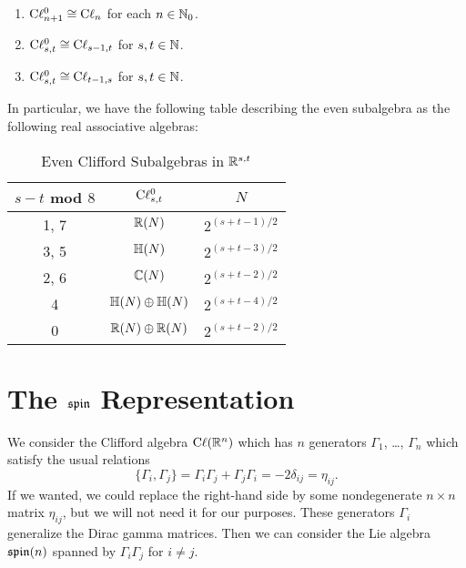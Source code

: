 \begin{theorem}\label{thm:lie:spin:even-clifford-isomorphisms}
  \begin{enumerate}
  \item $\mathrm{C}\ell_{n+1}^{0}\cong\mathrm{C}\ell_{n}$ for each $n\in\mathbb{N}_{0}$.
  \item $\mathrm{C}\ell_{s,t}^{0}\cong\mathrm{C}\ell_{s-1,t}$ for $s, t\in\mathbb{N}$.
  \item $\mathrm{C}\ell_{s,t}^{0}\cong\mathrm{C}\ell_{t-1,s}$ for $s, t\in\mathbb{N}$.
  \end{enumerate}
\end{theorem}

In particular, we have the following table describing the even
subalgebra as the following real associative algebras:

\begin{table}[h!]
\centering
\begin{tabular}{|c|c|c|} \hline
  $s-t$ mod $8$ & $\mathrm{C}\ell_{s,t}^{0}$ & $N$ \\\hline
           1, 7 &       $\mathbb{R}(N)$ & $2^{(s+t-1)/2}$\\
           3, 5 &       $\mathbb{H}(N)$ & $2^{(s+t-3)/2}$\\ \hline
           2, 6 &       $\mathbb{C}(N)$ & $2^{(s+t-2)/2}$\\
              4 & $\mathbb{H}(N)\oplus\mathbb{H}(N)$ & $2^{(s+t-4)/2}$\\
              0 & $\mathbb{R}(N)\oplus\mathbb{R}(N)$ & $2^{(s+t-2)/2}$\\ \hline
\end{tabular}
\caption{Even Clifford Subalgebras in $\mathbb{R}^{s,t}$}
\end{table}

\section{The $\operatorname{\mathfrak{spin}}$ Representation}

\M
We consider the Clifford algebra $\mathrm{C}\ell(\mathbb{R}^{n})$ which has $n$ generators
$\Gamma_{1}$, \dots, $\Gamma_{n}$ which satisfy the usual relations
\begin{equation}\label{eq:spin:clifford-anticommutator}
\{\Gamma_{i}, \Gamma_{j}\} = \Gamma_{i}\Gamma_{j} + \Gamma_{j}\Gamma_{i} = -2\delta_{ij} = \eta_{ij}.
\end{equation}
If we wanted, we could replace the right-hand side by some nondegenerate
$n\times n$ matrix $\eta_{ij}$, but we will not need it for our purposes.
These generators $\Gamma_{i}$ generalize the Dirac gamma matrices. Then we
can consider the Lie algebra $\operatorname{\mathfrak{spin}}(n)$ spanned by $\Gamma_{i}\Gamma_{j}$ for
$i\neq j$.

